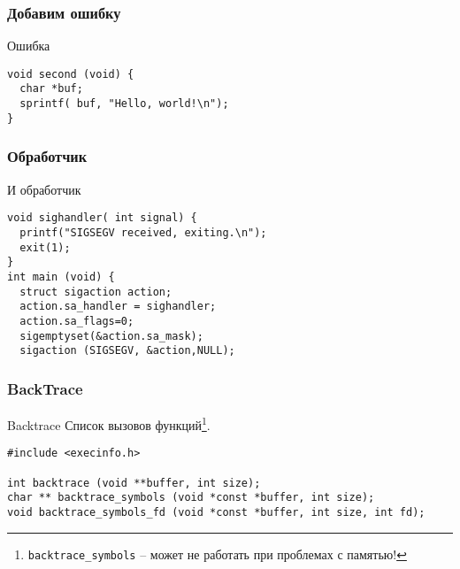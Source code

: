 %
%
%
%

\begin{frame}[fragile]
	\frametitle{Добавим ошибку}

	\begin{block}{Ошибка}
	
	\begin{lstlisting}
void second (void) {
  char *buf;
  sprintf( buf, "Hello, world!\n");
}
	\end{lstlisting}
	\end{block}
	
\end{frame}
\begin{frame}[fragile]
  \frametitle{Обработчик}
	\begin{block}{И обработчик}
	\begin{lstlisting}
void sighandler( int signal) {
  printf("SIGSEGV received, exiting.\n");
  exit(1);
}
int main (void) {
  struct sigaction action;
  action.sa_handler = sighandler;
  action.sa_flags=0;
  sigemptyset(&action.sa_mask);
  sigaction (SIGSEGV, &action,NULL);
	\end{lstlisting}
	\end{block}

\end{frame}



\begin{frame}[fragile]
	\frametitle{BackTrace}

	\begin{block}{Backtrace}
		Список вызовов функций\footnote{{\tt backtrace\_symbols} -- может не работать при проблемах с памятью!}.

	\end{block}

	\begin{lstlisting}
#include <execinfo.h>

int backtrace (void **buffer, int size);
char ** backtrace_symbols (void *const *buffer, int size);
void backtrace_symbols_fd (void *const *buffer, int size, int fd);
	\end{lstlisting}
\end{frame}

